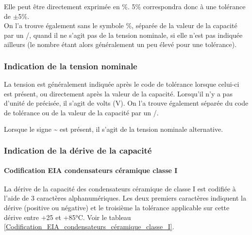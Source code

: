 \documentclass[a4paper]{article}
\begin{document}
Elle peut être directement exprimée en \%. \og{}5\%\fg{} correspondra donc à une tolérance de $\pm$5\%.\\
On l'a trouve également sans le symbole \%, séparée de la valeur de la capacité par un \og{}/\fg{}, quand il ne s'agit pas de la tension nominale, si elle n'est pas indiquée ailleurs (le nombre étant alors généralement un peu élevé pour une tolérance).

\subsubsection{Indication de la tension nominale}

La tension est généralement indiquée après le code de tolérance lorsque celui-ci est présent, ou directement après la valeur de la capacité. Lorsqu'il n'y a pas d'unité de précisée, il s'agit de volts (V). On l'a trouve également séparée du code de tolérance ou de la valeur de la capacité par un \og{}/\fg{}.

Lorsque le signe \og{}\~\fg{} est présent, il s'agit de la tension nominale alternative.

\subsubsection{Indication de la dérive de la capacité}

\paragraph{Codification EIA condensateurs céramique classe I}

La dérive de la capacité des condensateurs céramique de classe I est codifiée à l'aide de 3 caractères alphanumériques. Les deux premiers caractères indiquent la dérive (positive ou négative) et le troisième la tolérance applicable sur cette dérive entre +25 et +85°C. Voir le tableau \ref{Codification_EIA_condensateurs_céramique_classe_I}.
\end{document}

